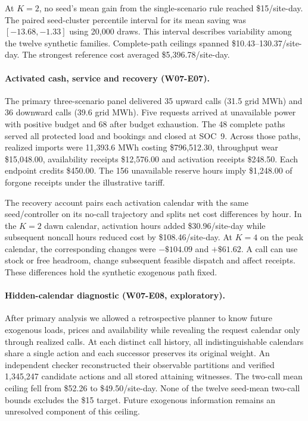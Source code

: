\documentclass[11pt,letterpaper]{article}
\begin{document}
At $K=2$, no seed's mean gain from the single-scenario rule reached \$15/site-day. The paired seed-cluster percentile interval for its mean saving was $[-13.68,-1.33]$ using 20,000 draws. This interval describes variability among the twelve synthetic families. Complete-path ceilings spanned \$10.43--130.37/site-day. The strongest reference cost averaged \$5,396.78/site-day.

\paragraph{Activated cash, service and recovery (W07-E07).}
The primary three-scenario panel delivered 35 upward calls (31.5 grid MWh) and 36 downward calls (39.6 grid MWh). Five requests arrived at unavailable power with positive budget and 68 after budget exhaustion. The 48 complete paths served all protected load and bookings and closed at SOC~9. Across those paths, realized imports were 11,393.6 MWh costing \$796,512.30, throughput wear \$15,048.00, availability receipts \$12,576.00 and activation receipts \$248.50. Each endpoint credits \$450.00. The 156 unavailable reserve hours imply \$1,248.00 of forgone receipts under the illustrative tariff.

The recovery account pairs each activation calendar with the same seed/controller on its no-call trajectory and splits net cost differences by hour. In the $K=2$ dawn calendar, activation hours added \$30.96/site-day while subsequent noncall hours reduced cost by \$108.46/site-day. At $K=4$ on the peak calendar, the corresponding changes were $-\$104.09$ and $+\$61.62$. A call can use stock or free headroom, change subsequent feasible dispatch and affect receipts. These differences hold the synthetic exogenous path fixed.

\paragraph{Hidden-calendar diagnostic (W07-E08, exploratory).}
After primary analysis we allowed a retrospective planner to know future exogenous loads, prices and availability while revealing the request calendar only through realized calls. At each distinct call history, all indistinguishable calendars share a single action and each successor preserves its original weight. An independent checker reconstructed their observable partitions and verified 1,345,247 candidate actions and all stored attaining witnesses. The two-call mean ceiling fell from \$52.26 to \$49.50/site-day. None of the twelve seed-mean two-call bounds excludes the \$15 target. Future exogenous information remains an unresolved component of this ceiling.
\end{document}
